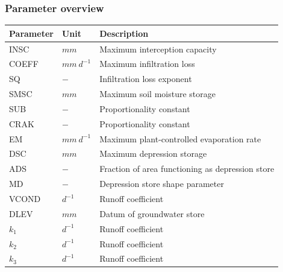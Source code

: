 \subsubsection{Parameter overview}
\begin{table}[htbp]
  \centering
    \begin{tabular}{lll}
    \toprule
    Parameter & Unit  & Description \\
    \midrule
    INSC  & $mm$  & Maximum interception capacity \\
    COEFF & $mm~d^{-1}$ & Maximum infiltration loss \\
    SQ    & $-$   & Infiltration loss exponent \\
    SMSC  & $mm$  & Maximum soil moisture storage \\
    SUB   & $-$   & Proportionality constant \\
    CRAK  & $-$   & Proportionality constant \\
    EM    & $mm~d^{-1}$ & Maximum plant-controlled evaporation rate \\
    DSC   & $mm$  & Maximum depression storage \\
    ADS   & $-$   & Fraction of area functioning as depression store \\
    MD    & $-$   & Depression store shape parameter \\
    VCOND & $d^{-1}$ & Runoff coefficient \\
    DLEV  & $mm$  & Datum of groundwater store \\
    $k_1$ & $d^{-1}$ & Runoff coefficient \\
    $k_2$ & $d^{-1}$ & Runoff coefficient \\
    $k_3$ & $d^{-1}$ & Runoff coefficient \\
    \bottomrule
    \end{tabular}%
  \label{tab:addlabel}%
\end{table}%

